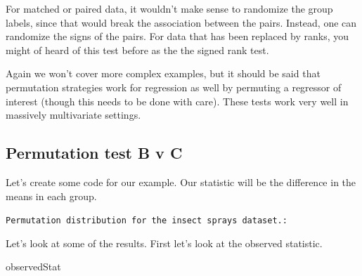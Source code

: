 \documentclass[]{article}
\newenvironment{Shaded}{\begin{snugshade}}{\end{snugshade}}
\newcommand{\KeywordTok}[1]{\textcolor[rgb]{0.13,0.29,0.53}{\textbf{{#1}}}}
\newcommand{\DecValTok}[1]{\textcolor[rgb]{0.00,0.00,0.81}{{#1}}}
\newcommand{\StringTok}[1]{\textcolor[rgb]{0.31,0.60,0.02}{{#1}}}
\newcommand{\NormalTok}[1]{{#1}}
\begin{document}
For matched or paired data, it wouldn't make sense to randomize the
group labels, since that would break the association between the pairs.
Instead, one can randomize the signs of the pairs. For data that has
been replaced by ranks, you might of heard of this test before as the
the signed rank test.

Again we won't cover more complex examples, but it should be said that
permutation strategies work for regression as well by permuting a
regressor of interest (though this needs to be done with care). These
tests work very well in massively multivariate settings.

\subsection{Permutation test B v C}\label{permutation-test-b-v-c}

Let's create some code for our example. Our statistic will be the
difference in the means in each group.

\vspace{1pc}

\verb;Permutation distribution for the insect sprays dataset.:;

\begin{Shaded}
\end{Shaded}

Let's look at some of the results. First let's look at the observed
statistic.

\begin{Shaded}
\begin{Highlighting}[]
\NormalTok{observedStat}
\end{Highlighting}
\end{Shaded}
\end{document}
